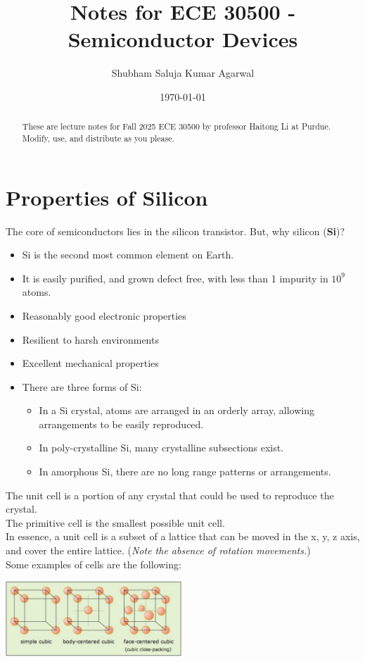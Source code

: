 \documentclass[nobib]{tufte-handout}
\title{Notes for ECE 30500 - Semiconductor Devices}
\author[Shubham Saluja Kumar Agarwal]{Shubham Saluja Kumar Agarwal}
\date{\today}  %
\begin{document}
\maketitle

\begin{abstract}
    These are lecture notes for Fall 2025 ECE 30500 by professor Haitong Li at Purdue. Modify, use, and distribute as you please.
\end{abstract}

\tableofcontents

\newpage

\section{Properties of Silicon}
The core of semiconductors lies in the silicon transistor. But, why silicon (\textbf{Si})?\\
\begin{itemize}
    \item Si is the second most common element on Earth.
    \item It is easily purified, and grown defect free, with less than 1 impurity in $10^9$ atoms.
    \item Reasonably good electronic properties
    \item Resilient to harsh environments
    \item Excellent mechanical properties
    \item There are three forms of Si: \begin{itemize}
        \item In a Si crystal, atoms are arranged in an orderly array, allowing arrangements to be easily reproduced.
        \item In poly-crystalline Si, many crystalline subsections exist.
        \item In amorphous Si, there are no long range patterns or arrangements.
    \end{itemize}
\end{itemize}
The unit cell is a portion of any crystal that could be used to reproduce the crystal.\\
The primitive cell is the smallest possible unit cell.\\
In essence, a unit cell is a subset of a lattice that can be moved in the x, y, z axis, and cover the entire lattice. (\textit{Note the absence of rotation movements.})\\
Some examples of cells are the following:
\begin{center}
    \includegraphics[width = 250px]{images/unit_cell_cube.png}
\end{center}
\end{document}
